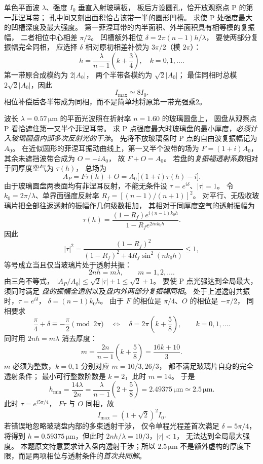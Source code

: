 单色平面波 $\lambda$、强度 $I_0$ 垂直入射玻璃板，
板后方设圆孔，恰开放观察点 P 的第一菲涅耳带；
孔中间又刻出面积恰占该带一半的圆形凹槽。
求使 P 处强度最大的凹槽深度及最大强度。
\exsolution
第一菲涅耳带的内半面积、外半面积具有相等模的复振幅，
二者相位中心相差 $\pi/2$。
凹槽额外相位
$\delta=2\pi(n-1)h/\lambda$，
要使两部分复振幅完全同相，
应选择 $\delta$ 相对原初相差补偿为
$3\pi/2$（模 $2\pi$）：
\[
\boxed{h=\frac{\lambda}{n-1}
\left(k+\frac34\right)},\quad k=0,1,\ldots.
\]
第一带原合成模约为 $2|A_0|$，
两个半带各模约为 $\sqrt2|A_0|$；
最佳同相时总模
$2\sqrt2|A_0|$，因此
\[
\boxed{I_{\max}\simeq8I_0}.
\]
\excheck 相位补偿后各半带成为同相，而不是简单地将原第一带光强乘2。

波长 $\lambda=0.57\,\mathrm{\mu m}$ 的平面光波照在折射率
$n=1.60$ 的玻璃圆盘上，
圆盘从观察点 P 看恰遮住第一又半个菲涅耳带。
求 P 点强度最大时玻璃盘的最小厚度，\emph{必须计入玻璃圆盘内部多次反射光的干涉}。
\exsolution
先将不放玻璃盘时 P 点的自由波复振幅记为 $A_0$。
在近似圆形的菲涅耳振动曲线上，第一又半个波带的场为
$F=(1+i)A_0$，其余未遮挡波带合成为 $O=-iA_0$，
故 $F+O=A_0$。
若盘的\emph{复振幅透射系数}相对于同厚度空气为 $\tau(h)$，
总场为
\[
 A_P=F\tau(h)+O
 =A_0\bigl[(1+i)\tau(h)-i\bigr].
\]
由于玻璃圆盘两表面均有菲涅耳反射，不能无条件设
$\tau=e^{i\delta}$、$|\tau|=1$。
令 $k_0=2\pi/\lambda$、单界面强度反射率
$R_f=[(n-1)/(n+1)]^2$。
对平行、无吸收玻璃片把全部往返透射的振幅作几何级数相加，
其相对于同厚度空气的透射振幅为
\[
 \tau(h)=
 \frac{(1-R_f)e^{i(n-1)k_0h}}
 {1-R_f e^{2ink_0h}}.
\]
因此
\[
 |\tau|^2
 =\frac{(1-R_f)^2}
 {(1-R_f)^2+4R_f\sin^2(nk_0h)}
 \le1,
\]
等号成立当且仅当玻璃片处于透射共振：
\[
 \boxed{2nh=m\lambda},\qquad m=1,2,\ldots .
\]
由三角不等式，
$|A_P/A_0|\le\sqrt2|\tau|+1\le\sqrt2+1$。
要使 P 点光强达到全局最大，须同时满足
\emph{盘的振幅全透射}以及\emph{盘内外两部分复振幅同相}。
处于上述透射共振时，$\tau=e^{i\delta}$，
$\delta=(n-1)k_0h$。
由于 $F$ 的相位是 $\pi/4$、$O$ 的相位是 $-\pi/2$，
同相要求
\[
 \frac\pi4+\delta\equiv-\frac\pi2\pmod{2\pi}
 \quad\Longleftrightarrow\quad
 \boxed{\delta=2\pi\left(k+\frac58\right)},
 \qquad k=0,1,\ldots .
\]
同时用 $2nh=m\lambda$ 消去厚度：
\[
 m=\frac{2n}{n-1}\left(k+\frac58\right)
 =\frac{16k+10}{3}.
\]
$m$ 必须为整数，$k=0,1$ 分别对应 $m=10/3,26/3$，
都不满足玻璃片自身的完全透射条件；
最小可行整数阶数是 $k=2$，此时 $m=14$。
于是
\[
 \boxed{h_{\min}
 =\frac{14\lambda}{2n}
 =\frac{\lambda}{n-1}\left(2+\frac58\right)
 =2.49375\,\mathrm{\mu m}\simeq2.5\,\mathrm{\mu m}}.
\]
此时 $\tau=e^{i5\pi/4}$，
$F\tau$ 与 $O$ 同相，故
\[
 \boxed{I_{\max}=(1+\sqrt2)^2I_0}.
\]
\excheck 若错误地忽略玻璃盘内部的多束透射干涉，
仅令单程光程差首次满足 $\delta=5\pi/4$，
将得到 $h=0.59375\,\mathrm{\mu m}$，但此时
$2nh/\lambda=10/3$，$|\tau|<1$，
无法达到全局最大强度。
本题原文特意要求计入盘内透射干涉；所以 $2.5\,\mathrm{\mu m}$
不是额外虚构的厚度下限，而是两项相位与透射条件的\emph{首次共同解}。

